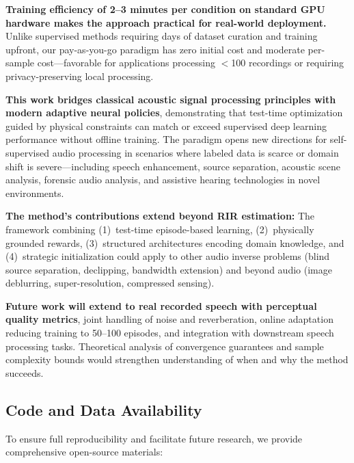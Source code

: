 \documentclass[12pt,a4paper]{article}
\begin{document}
\textbf{Training efficiency of 2--3 minutes per condition on standard GPU hardware makes the approach practical for real-world deployment.} Unlike supervised methods requiring days of dataset curation and training upfront, our pay-as-you-go paradigm has zero initial cost and moderate per-sample cost—favorable for applications processing $<$100 recordings or requiring privacy-preserving local processing.

\textbf{This work bridges classical acoustic signal processing principles with modern adaptive neural policies}, demonstrating that test-time optimization guided by physical constraints can match or exceed supervised deep learning performance without offline training. The paradigm opens new directions for self-supervised audio processing in scenarios where labeled data is scarce or domain shift is severe—including speech enhancement, source separation, acoustic scene analysis, forensic audio analysis, and assistive hearing technologies in novel environments.

\textbf{The method's contributions extend beyond RIR estimation:} The framework combining (1)~test-time episode-based learning, (2)~physically grounded rewards, (3)~structured architectures encoding domain knowledge, and (4)~strategic initialization could apply to other audio inverse problems (blind source separation, declipping, bandwidth extension) and beyond audio (image deblurring, super-resolution, compressed sensing).

\textbf{Future work will extend to real recorded speech with perceptual quality metrics}, joint handling of noise and reverberation, online adaptation reducing training to 50--100 episodes, and integration with downstream speech processing tasks. Theoretical analysis of convergence guarantees and sample complexity bounds would strengthen understanding of when and why the method succeeds.

\subsection*{Code and Data Availability}

To ensure full reproducibility and facilitate future research, we provide comprehensive open-source materials:
\end{document}
